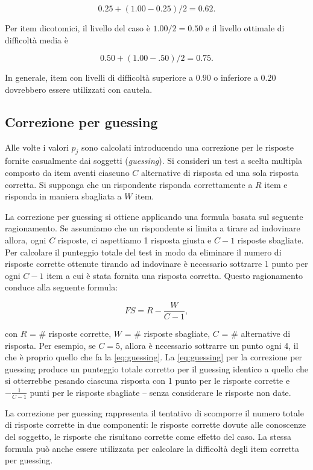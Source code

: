 \documentclass[
  11pt,
]{krantz}
\theoremstyle{definition}
\theoremstyle{definition}
\theoremstyle{definition}
\theoremstyle{definition}
\theoremstyle{remark}
\begin{document}
\[0.25 + (1.00 - 0.25) / 2 = 0.62.\]

Per item dicotomici, il livello del caso è \(1.00/2 = 0.50\) e il livello ottimale di difficoltà media è

\[0.50+(1.00-.50)/2 = 0.75.\]

In generale, item con livelli di difficoltà superiore a \(0.90\) o inferiore a \(0.20\) dovrebbero essere utilizzati con cautela.

\hypertarget{correzione-per-guessing}{%
\subsection{Correzione per guessing}\label{correzione-per-guessing}}

Alle volte i valori \(p_j\) sono calcolati introducendo una correzione per le risposte fornite casualmente dai soggetti (\emph{guessing}). Si consideri un test a scelta multipla composto da item aventi ciascuno \(C\) alternative di risposta ed una sola risposta corretta. Si supponga che un rispondente risponda correttamente a \(R\) item e risponda in maniera sbagliata a \(W\) item.

La correzione per guessing si ottiene applicando una formula basata sul seguente ragionamento. Se assumiamo che un rispondente si limita a tirare ad indovinare allora, ogni \(C\) risposte, ci aspettiamo 1 risposta giusta e \(C-1\) risposte sbagliate. Per calcolare il punteggio totale del test in modo da eliminare il numero di risposte corrette ottenute tirando ad indovinare è necessario sottrarre 1 punto per ogni \(C-1\) item a cui è stata fornita una risposta corretta. Questo ragionamento conduce alla seguente formula:

\begin{equation}
FS = R - \frac{W}{C - 1},
\label{eq:guessing}
\end{equation}

con \(R\) = \# risposte corrette, \(W\) = \# risposte sbagliate, \(C\) = \# alternative di risposta. Per esempio, se \(C=5\), allora è necessario sottrarre un punto ogni 4, il che è proprio quello che fa la \eqref{eq:guessing}. La \eqref{eq:guessing} per la correzione per guessing produce un punteggio totale corretto per il guessing identico a quello che si otterrebbe pesando ciascuna risposta con 1 punto per le risposte corrette e \(- \frac{1}{C-1}\) punti per le risposte sbagliate -- senza considerare le risposte non date.

La correzione per guessing rappresenta il tentativo di scomporre il numero totale di risposte corrette in due componenti: le risposte corrette dovute alle conoscenze del soggetto, le risposte che risultano corrette come effetto del caso. La stessa formula può anche essere utilizzata per calcolare la difficoltà degli item corretta per guessing.
\end{document}
